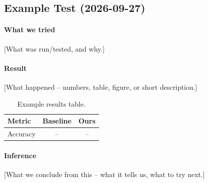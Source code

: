 \subsection{Example Test (2026-09-27)}
\label{exp:example}

\paragraph{What we tried} [What was run/tested, and why.]

\paragraph{Result} [What happened -- numbers, table, figure, or short description.]

\begin{table}[H]
\centering
\begin{tabular}{lcc}
\toprule
Metric & Baseline & Ours \\
\midrule
Accuracy & -- & -- \\
\bottomrule
\end{tabular}
\caption{Example results table.}
\label{tab:example-results}
\end{table}


\paragraph{Inference} [What we conclude from this -- what it tells us, what to try next.]
